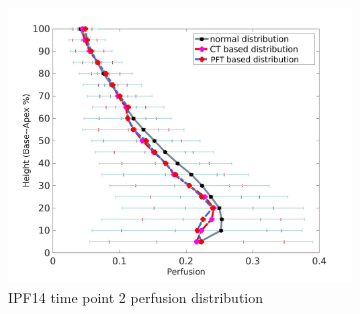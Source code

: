 \begin{figure}[htbp]
\begin{subfigure}{.6\linewidth}
  \includegraphics[width=\linewidth,trim={{.0\wd0} {.0\wd0} {.0\wd0} {.0\wd0}},clip]{Appendix/Image_AppexB/IPF1402/IPF1402_PerfusionAgainstLungHeight.png}
  \caption{IPF14 time point 2 perfusion distribution}
  \label{fig:VQDistribution-b}
\end{subfigure}
\begin{subfigure}{.6\linewidth}%

\end{subfigure}
\end{figure}
